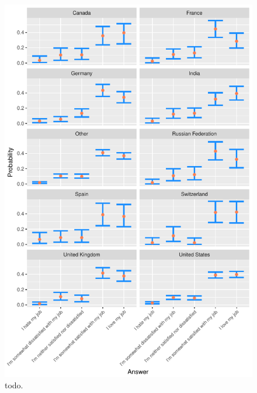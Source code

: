 \documentclass[9pt]{article}
\begin{document}
\begin{figure}[H]
\centering
\includegraphics{report-012}
\caption{todo.}\label{fig_2}
\end{figure}
\end{document}
